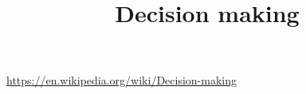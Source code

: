 \documentclass[a4paper]{standalone}
\title{Decision making}
\begin{document}
    \maketitle
    \url{https://en.wikipedia.org/wiki/Decision-making}
\end{document}
